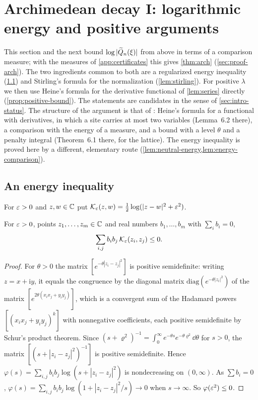\section{Archimedean decay I: logarithmic energy and positive arguments}\label{sec:energy}

This section and the next bound $\log|\widetilde{Q}_n(\xi)|$ from above in terms of a comparison measure; with the measures of \cref{app:certificates} this gives \cref{thm:arch} (\cref{sec:proof-arch}). The two ingredients common to both are a regularized energy inequality (\cref{sec:energy-inequality}) and Stirling's formula for the normalization (\cref{lem:stirling}). For positive $\lambda$ we then use Heine's formula for the derivative functional of \cref{lem:series} directly (\cref{prop:positive-bound}). The statements are candidates in the sense of \cref{sec:intro-status}. The structure of the argument is that of \cite[Section~6]{Litsey2026Li2}: Heine's formula for a functional with derivatives, in which a site carries at most two variables (Lemma~6.2 there), a comparison with the energy of a measure, and a bound with a level $\theta$ and a penalty integral (Theorem~6.1 there, for the lattice). The energy inequality is proved here by a different, elementary route (\cref{lem:neutral-energy,lem:energy-comparison}).

\subsection{An energy inequality}\label{sec:energy-inequality}
For $\varepsilon>0$ and $z,w\in\mathbb{C}$ put $\mathcal K_\varepsilon(z,w)=\tfrac12\log(|z-w|^2+\varepsilon^2)$.

\begin{lemma}\label{lem:neutral-energy}
For $\varepsilon>0$, points $z_1,\dots,z_m\in\mathbb{C}$ and real numbers $b_1,\dots,b_m$ with $\sum_ib_i=0$,
\[
\sum_{i,j}b_ib_j\,\mathcal K_\varepsilon(z_i,z_j)\le0 .
\]
\end{lemma}

\begin{proof}
For $\theta>0$ the matrix $[e^{-\theta|z_i-z_j|^2}]$ is positive semidefinite: writing $z=x+\mathrm iy$, it equals the congruence by the diagonal matrix $\mathrm{diag}(e^{-\theta|z_i|^2})$ of the matrix $[e^{2\theta(x_ix_j+y_iy_j)}]$, which is a convergent sum of the Hadamard powers $[(x_ix_j+y_iy_j)^k]$ with nonnegative coefficients, each positive semidefinite by Schur's product theorem. Since $(s+\varrho^2)^{-1}=\int_0^\infty e^{-\theta s}e^{-\theta\varrho^2}\dd\theta$ for $s>0$, the matrix $[(s+|z_i-z_j|^2)^{-1}]$ is positive semidefinite. Hence $\varphi(s)=\sum_{i,j}b_ib_j\log(s+|z_i-z_j|^2)$ is nondecreasing on $(0,\infty)$. As $\sum b_i=0$, $\varphi(s)=\sum_{i,j}b_ib_j\log(1+|z_i-z_j|^2/s)\to0$ when $s\to\infty$. So $\varphi(\varepsilon^2)\le0$.
\end{proof}

